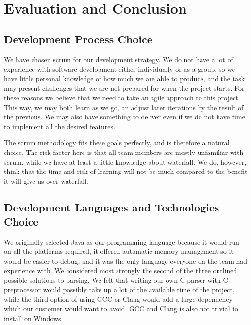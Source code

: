 \section{Evaluation and Conclusion}
\label{sec:pre:eval}

\subsection{Development Process Choice}
\label{sec:pre:devchoice}
We have chosen scrum for our development strategy. We do not have a lot of
experience with software development either individually or as a group, so we
have little personal knowledge of how much we are able to produce, and the
task may present challenges that we are not prepared for when the project
starts. For these reasons we believe that we need to take an agile approach to
this project. This way, we may both learn as we go, an adjust later iterations
by the result of the previous. We may also have something to deliver even if we
do not have time to implement all the desired features.

The scrum methodology fits these goals perfectly, and is therefore a natural
choice. The risk factor here is that all team members are mostly unfamiliar
with scrum, while we have at least a little knowledge about waterfall. We do,
however, think that the time and risk of learning will not be much compared to
the benefit it will give us over waterfall.

\subsection{Development Languages and Technologies Choice}
\label{sec:pre:langchoice}
We originally selected Java as our programming language because it would run on
all the platforms required, it offered automatic memory management so it would
be easier to debug, and it was the only language everyone on the team had
experience with. We considered most strongly the second of the three outlined
possible solutions to parsing. We felt that writing our own C parser with C
preprocessor would possibly take up a lot of the available time of the project,
while the third option of using GCC or Clang would add a large dependency which
our customer would want to avoid. GCC and Clang is also not trivial to install
on Windows.

